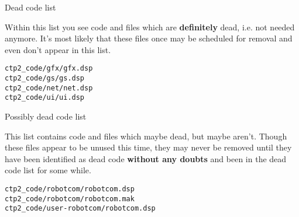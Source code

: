 \begin{section}{Dead code list}

Within this list you see code and files which are \textbf{definitely} dead, i.e. not needed anymore. It's most likely that these files once may be scheduled for removal and even don't appear in this list.

\begin{verbatim}
ctp2_code/gfx/gfx.dsp
ctp2_code/gs/gs.dsp
ctp2_code/net/net.dsp
ctp2_code/ui/ui.dsp
\end{verbatim}

\end{section}%

\begin{section}{Possibly dead code list}

This list contains code and files which maybe dead, but maybe aren't. Though these files appear to be unused this time, they may never be removed until they have been identified as dead code \textbf{without any doubts} and been in the dead code list for some while.

\begin{verbatim}
ctp2_code/robotcom/robotcom.dsp
ctp2_code/robotcom/robotcom.mak
ctp2_code/user-robotcom/robotcom.dsp
\end{verbatim}

\end{section}%
